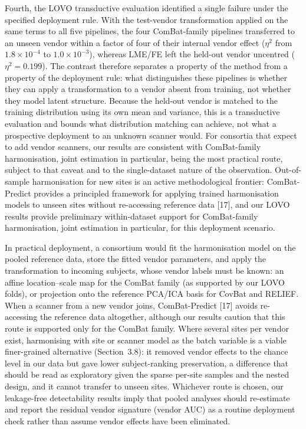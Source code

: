 \documentclass[12pt,a4paper]{article}
\begin{document}
Fourth, the LOVO transductive evaluation identified a single failure under the specified deployment rule. With the test-vendor transformation applied on the same terms to all five pipelines, the four ComBat-family pipelines transferred to an unseen vendor within a factor of four of their internal vendor effect ($\eta^2$ from $1.8\times10^{-4}$ to $1.0\times10^{-3}$), whereas LME/FE left the held-out vendor uncentred ($\eta^2=0.199$). The contrast therefore separates a property of the method from a property of the deployment rule: what distinguishes these pipelines is whether they can apply a transformation to a vendor absent from training, not whether they model latent structure. Because the held-out vendor is matched to the training distribution using its own mean and variance, this is a transductive evaluation and bounds what distribution matching can achieve, not what a prospective deployment to an unknown scanner would. For consortia that expect to add vendor scanners, our results are consistent with ComBat-family harmonisation, joint estimation in particular, being the most practical route, subject to that caveat and to the single-dataset nature of the observation. Out-of-sample harmonisation for new sites is an active methodological frontier: ComBat-Predict provides a principled framework for applying trained harmonisation models to unseen sites without re-accessing reference data [17], and our LOVO results provide preliminary within-dataset support for ComBat-family harmonisation, joint estimation in particular, for this deployment scenario.

In practical deployment, a consortium would fit the harmonisation model on the pooled reference data, store the fitted vendor parameters, and apply the transformation to incoming subjects, whose vendor labels must be known: an affine location--scale map for the ComBat family (as supported by our LOVO folds), or projection onto the reference PCA/ICA basis for CovBat and RELIEF. When a scanner from a new vendor joins, ComBat-Predict [17] avoids re-accessing the reference data altogether, although our results caution that this route is supported only for the ComBat family. Where several sites per vendor exist, harmonising with site or scanner model as the batch variable is a viable finer-grained alternative (Section~3.8): it removed vendor effects to the chance level in our data but gave lower subject-ranking preservation, a difference that should be read as exploratory given the sparse per-site samples and the nested design, and it cannot transfer to unseen sites. Whichever route is chosen, our leakage-free detectability results imply that pooled analyses should re-estimate and report the residual vendor signature (vendor AUC) as a routine deployment check rather than assume vendor effects have been eliminated.
\end{document}
